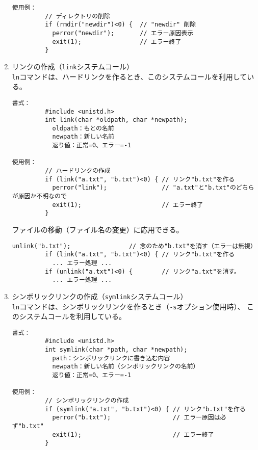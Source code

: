 \documentclass[a4j,dvipdfmx]{jarticle}
\begin{document}
\begin{enumerate}
\begin{lstlisting}[numbers=none]
使用例：
         // ディレクトリの削除
         if (rmdir("newdir")<0) {  // "newdir" 削除
           perror("newdir");       // エラー原因表示
           exit(1);                // エラー終了
         }

\end{lstlisting}

\newpage

\item リンクの作成（{\tt link}システムコール）\\
{\tt ln}コマンドは、ハードリンクを作るとき、このシステムコールを利用している。

\begin{lstlisting}[numbers=none]
書式：
         #include <unistd.h>
         int link(char *oldpath, char *newpath);
           oldpath：もとの名前
           newpath：新しい名前
           返り値：正常=0、エラー=-1

使用例：
         // ハードリンクの作成
         if (link("a.txt", "b.txt")<0) { // リンク"b.txt"を作る
           perror("link");               // "a.txt"と"b.txt"のどちらが原因か不明なので
           exit(1);                      // エラー終了
         }

\end{lstlisting}

ファイルの移動（ファイル名の変更）に応用できる。
\begin{lstlisting}[numbers=none]
         unlink("b.txt");                // 念のため"b.txt"を消す（エラーは無視）
         if (link("a.txt", "b.txt")<0) { // リンク"b.txt"を作る
           ... エラー処理 ... 
         if (unlink("a.txt")<0) {        // リンク"a.txt"を消す。
           ... エラー処理 ... 

\end{lstlisting}

\item シンボリックリンクの作成（{\tt symlink}システムコール）\\
{\tt ln}コマンドは、シンボリックリンクを作るとき（{\tt -s}オプション使用時）、
このシステムコールを利用している。

\begin{lstlisting}[numbers=none]
書式：
         #include <unistd.h>
         int symlink(char *path, char *newpath);
           path：シンボリックリンクに書き込む内容
           newpath：新しい名前（シンボリックリンクの名前）
           返り値：正常=0、エラー=-1

使用例：
         // シンボリックリンクの作成
         if (symlink("a.txt", "b.txt")<0) { // リンク"b.txt"を作る
           perror("b.txt");                 // エラー原因は必ず"b.txt"
           exit(1);                         // エラー終了
         }


\end{lstlisting}
\end{enumerate}
\end{document}
